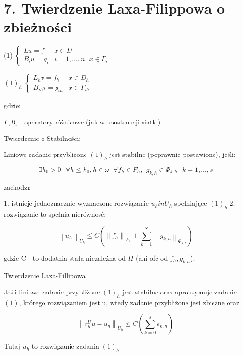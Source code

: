 \section{7. Twierdzenie Laxa-Filippowa o zbieżności}

(1) $\left\{\begin{matrix} Lu = f & x \in D \\ B_iu = g_i & i = 1,...,n\ \ \ x \in \Gamma _i \end{matrix}\right.$

$(1)_h$ $\left\{\begin{matrix} L_hv = f_h & x \in D_h \\ B_{ih} \tau = g_{ih} & x \in \Gamma _{ih} \end{matrix}\right.$

gdzie:

$L$,$B_i$ - operatory różnicowe (jak w konstrukcji siatki)

Twierdzenie o Stabilności:

Liniowe zadanie przybliżone $(1)_h$ jest stabilne (poprawnie postawione), jeśli:

\[ \exists h_0 > 0 \ \ \ \forall h \leqslant h_0 , h \in \omega \ \ \ \forall f_h \in F_h,\ \  g_{k,h} \in \Phi _{k,h}\ \ \ k = 1,...,s\]

zachodzi:

1. istnieje jednoznacznie wyznaczone rozwiązanie $u_h in U_h$ spełniające $(1)_h$
2. rozwiązanie to spełnia nierówność:

\[ \left \| u_h \right  \|_{U_h} \leqslant C(\left \| f_h \right \|_{F_h} + \sum_{k=1}^S \left \| g_{k,h} \right \|_{\Phi _{k,h}}) \]

gdzie C - to dodatnia stała niezależna od $H$ (ani ofc od $f_h, g_{k,h}$).

Twierdzenie Laxa-Fillipowa

Jeśli liniowe zadanie przybliżone $(1)_h$ jest stabilne oraz aproksymuje zadanie $(1)$, którego rozwiązaniem jest u, wtedy zadanie przybliżone jest zbieżne oraz

\[ \left \| r_h^U u - u_h \right \|_{U_h} \leqslant C(\sum_{k=0}^{s} e_{k,h}) \]

Tutaj $u_h$ to rozwiązanie zadania $(1)_h$
